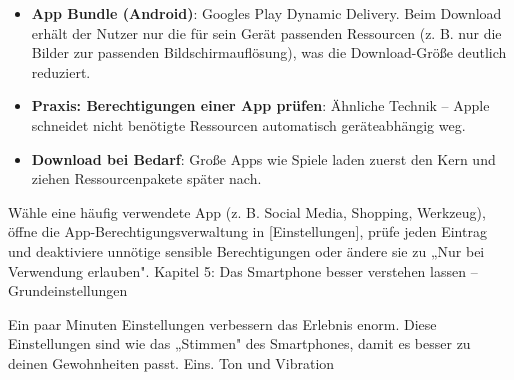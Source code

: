 \begin{itemize}
  \item \textbf{App Bundle (Android)}: Googles Play Dynamic Delivery. Beim Download erhält der Nutzer nur die für sein Gerät passenden Ressourcen (z. B. nur die Bilder zur passenden Bildschirmauflösung), was die Download-Größe deutlich reduziert.
  \item \textbf{Praxis: Berechtigungen einer App prüfen}: Ähnliche Technik – Apple schneidet nicht benötigte Ressourcen automatisch geräteabhängig weg.
  \item \textbf{Download bei Bedarf}: Große Apps wie Spiele laden zuerst den Kern und ziehen Ressourcenpakete später nach.
\end{itemize}

\begin{tcbinfo}{Wähle eine häufig verwendete App (z. B. Social Media, Shopping, Werkzeug), öffne die App-Berechtigungsverwaltung in [Einstellungen], prüfe jeden Eintrag und deaktiviere unnötige sensible Berechtigungen oder ändere sie zu „Nur bei Verwendung erlauben".}
Kapitel 5: Das Smartphone besser verstehen lassen – Grundeinstellungen

\end{tcbinfo}

\begin{tcbpractice}{Ein paar Minuten Einstellungen verbessern das Erlebnis enorm. Diese Einstellungen sind wie das „Stimmen" des Smartphones, damit es besser zu deinen Gewohnheiten passt.}
Eins. Ton und Vibration

\end{tcbpractice}
